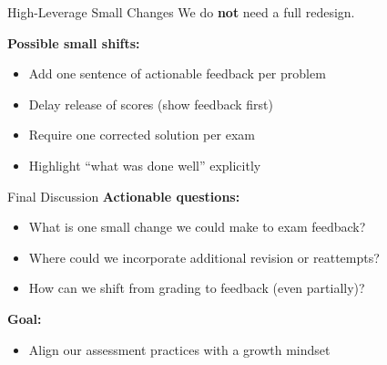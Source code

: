 \documentclass[dvipsnames]{beamer}
\begin{document}

\begin{frame}{High-Leverage Small Changes}
We do \textbf{not} need a full redesign.

\vspace{1em}

\textbf{Possible small shifts:}
\begin{itemize}
\item Add one sentence of actionable feedback per problem
\item Delay release of scores (show feedback first)
\item Require one corrected solution per exam
\item Highlight “what was done well” explicitly
\end{itemize}
\end{frame}







































\begin{frame}{Final Discussion}
\textbf{Actionable questions:}
\begin{itemize}
\item What is one small change we could make to exam feedback?
\item Where could we incorporate additional revision or reattempts?
\item How can we shift from grading to feedback (even partially)?
\end{itemize}

\vspace{1em}

\textbf{Goal:}
\begin{itemize}
\item Align our assessment practices with a growth mindset
\end{itemize}
\end{frame}

\end{document}
